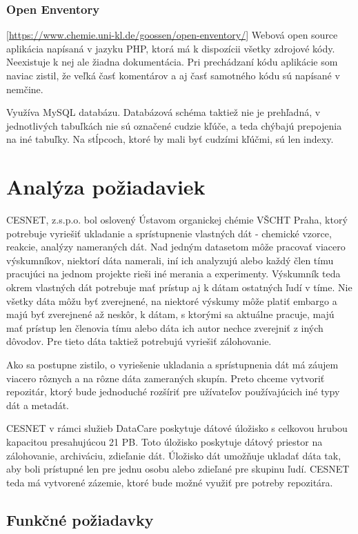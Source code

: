 \documentclass[thesis=M,slovak]{FITthesis}[2013/05/06]
\begin{document}
\subsection{Open Enventory} [\url{https://www.chemie.uni-kl.de/goossen/open-enventory/}]
Webová open source aplikácia napísaná v jazyku PHP, ktorá má k dispozícii všetky zdrojové kódy. Neexistuje k nej ale žiadna dokumentácia. 
Pri prechádzaní kódu aplikácie som naviac zistil, že veľká časť komentárov a aj časť samotného kódu sú napísané v nemčine. 

Využíva MySQL databázu. Databázová schéma taktiež nie je prehľadná, v jednotlivých tabuľkách nie sú označené cudzie kľúče, a teda chýbajú prepojenia na iné tabuľky. Na stĺpcoch, ktoré by mali byť cudzími kľúčmi, sú len indexy.


\chapter{Analýza požiadaviek}
CESNET, z.s.p.o. bol oslovený Ústavom organickej chémie VŠCHT Praha, ktorý potrebuje vyriešiť ukladanie a sprístupnenie vlastných dát - chemické vzorce, reakcie, analýzy nameraných dát. Nad jedným datasetom môže pracovať viacero výskumníkov, niektorí dáta namerali, iní ich analyzujú alebo každý člen tímu pracujúci na jednom projekte rieši iné merania a experimenty. Výskumník teda okrem vlastných dát potrebuje mať prístup aj k dátam ostatných ľudí v tíme. Nie všetky dáta môžu byť zverejnené, na niektoré výskumy môže platiť embargo a majú byť zverejnené až neskôr, k dátam, s ktorými sa aktuálne pracuje, majú mať prístup len členovia tímu alebo dáta ich autor nechce zverejniť z iných dôvodov. Pre tieto dáta taktiež potrebujú vyriešiť zálohovanie.

Ako sa postupne zistilo, o vyriešenie ukladania a sprístupnenia dát má záujem viacero rôznych a na rôzne dáta zameraných skupín. Preto chceme vytvoriť repozitár, ktorý bude jednoduché rozšíriť pre užívateľov používajúcich iné typy dát a metadát.

CESNET v rámci služieb DataCare poskytuje dátové úložisko s celkovou hrubou kapacitou presahujúcou 21 PB. Toto úložisko poskytuje dátový priestor na zálohovanie, archiváciu, zdieľanie dát. \cite{DataCare} Úložisko dát umožňuje ukladať dáta tak, aby boli prístupné len pre jednu osobu alebo zdieľané pre skupinu ľudí. \cite {DatoveUloziste} CESNET teda má vytvorené zázemie, ktoré bude možné využiť pre potreby repozitára.

\section{Funkčné požiadavky}
\end{document}
